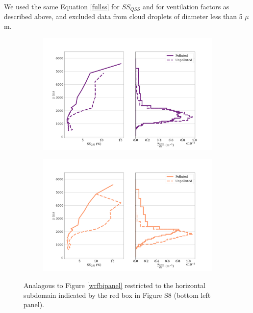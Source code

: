 \documentclass{article}
\begin{document}
We used the same Equation \ref{fullss} for $SS_{QSS}$ and for ventilation factors as described above, and excluded data from cloud droplets of diameter less than 5 $\mu$m.

\begin{figure}[ht]
	\centering
	\begin{subfigure}{0.7\textwidth}
		\includegraphics[width=\textwidth]{revmywrf/v2_FINAL_subdom_bipanel_ss_qss_vs_z_allpts_figure.png}
		\caption{}
		\label{wrfsubdombipanelallpts}
	\end{subfigure}
	\begin{subfigure}{0.7\textwidth}
		\includegraphics[width=\textwidth]{revmywrf/v2_FINAL_subdom_bipanel_ss_qss_vs_z_up10perc_figure.png}
		\caption{}
		\label{wrfsubdombipanelup50perc}
	\end{subfigure}
	\caption{Analagous to Figure \ref{wrfbipanel} restricted to the horizontal subdomain indicated by the red box in Figure S8 (bottom left panel).}
	\label{wrfsubdombipanel}
\end{figure}
\end{document}
